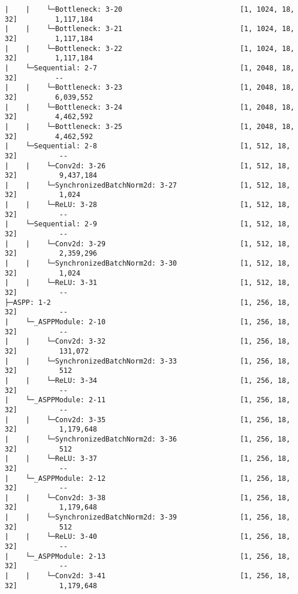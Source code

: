 \begin{verbatim}
|    |    └─Bottleneck: 3-20                            [1, 1024, 18, 32]         1,117,184
|    |    └─Bottleneck: 3-21                            [1, 1024, 18, 32]         1,117,184
|    |    └─Bottleneck: 3-22                            [1, 1024, 18, 32]         1,117,184
|    └─Sequential: 2-7                                  [1, 2048, 18, 32]         --
|    |    └─Bottleneck: 3-23                            [1, 2048, 18, 32]         6,039,552
|    |    └─Bottleneck: 3-24                            [1, 2048, 18, 32]         4,462,592
|    |    └─Bottleneck: 3-25                            [1, 2048, 18, 32]         4,462,592
|    └─Sequential: 2-8                                  [1, 512, 18, 32]          --
|    |    └─Conv2d: 3-26                                [1, 512, 18, 32]          9,437,184
|    |    └─SynchronizedBatchNorm2d: 3-27               [1, 512, 18, 32]          1,024
|    |    └─ReLU: 3-28                                  [1, 512, 18, 32]          --
|    └─Sequential: 2-9                                  [1, 512, 18, 32]          --
|    |    └─Conv2d: 3-29                                [1, 512, 18, 32]          2,359,296
|    |    └─SynchronizedBatchNorm2d: 3-30               [1, 512, 18, 32]          1,024
|    |    └─ReLU: 3-31                                  [1, 512, 18, 32]          --
├─ASPP: 1-2                                             [1, 256, 18, 32]          --
|    └─_ASPPModule: 2-10                                [1, 256, 18, 32]          --
|    |    └─Conv2d: 3-32                                [1, 256, 18, 32]          131,072
|    |    └─SynchronizedBatchNorm2d: 3-33               [1, 256, 18, 32]          512
|    |    └─ReLU: 3-34                                  [1, 256, 18, 32]          --
|    └─_ASPPModule: 2-11                                [1, 256, 18, 32]          --
|    |    └─Conv2d: 3-35                                [1, 256, 18, 32]          1,179,648
|    |    └─SynchronizedBatchNorm2d: 3-36               [1, 256, 18, 32]          512
|    |    └─ReLU: 3-37                                  [1, 256, 18, 32]          --
|    └─_ASPPModule: 2-12                                [1, 256, 18, 32]          --
|    |    └─Conv2d: 3-38                                [1, 256, 18, 32]          1,179,648
|    |    └─SynchronizedBatchNorm2d: 3-39               [1, 256, 18, 32]          512
|    |    └─ReLU: 3-40                                  [1, 256, 18, 32]          --
|    └─_ASPPModule: 2-13                                [1, 256, 18, 32]          --
|    |    └─Conv2d: 3-41                                [1, 256, 18, 32]          1,179,648

\end{verbatim}
